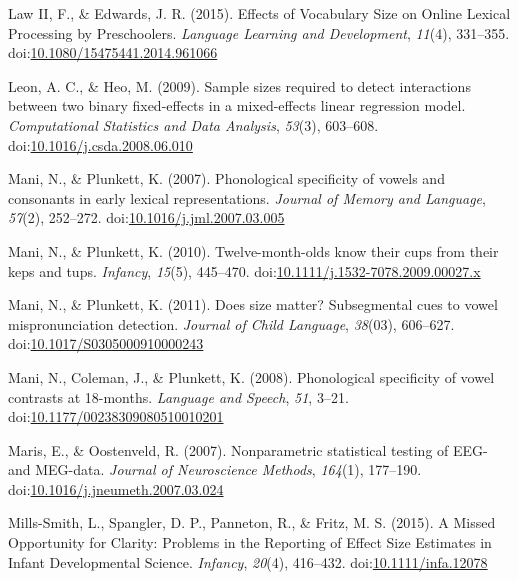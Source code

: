 \documentclass[man]{apa6}
\theoremstyle{definition}
\theoremstyle{definition}
\theoremstyle{definition}
\theoremstyle{remark}
\begin{document}
\hypertarget{ref-Law2015}{}
Law II, F., \& Edwards, J. R. (2015). Effects of Vocabulary Size on
Online Lexical Processing by Preschoolers. \emph{Language Learning and
Development}, \emph{11}(4), 331--355.
doi:\href{https://doi.org/10.1080/15475441.2014.961066}{10.1080/15475441.2014.961066}

\hypertarget{ref-Leon2009}{}
Leon, A. C., \& Heo, M. (2009). Sample sizes required to detect
interactions between two binary fixed-effects in a mixed-effects linear
regression model. \emph{Computational Statistics and Data Analysis},
\emph{53}(3), 603--608.
doi:\href{https://doi.org/10.1016/j.csda.2008.06.010}{10.1016/j.csda.2008.06.010}

\hypertarget{ref-Mani2007}{}
Mani, N., \& Plunkett, K. (2007). Phonological specificity of vowels and
consonants in early lexical representations. \emph{Journal of Memory and
Language}, \emph{57}(2), 252--272.
doi:\href{https://doi.org/10.1016/j.jml.2007.03.005}{10.1016/j.jml.2007.03.005}

\hypertarget{ref-Mani2010kepstups}{}
Mani, N., \& Plunkett, K. (2010). Twelve-month-olds know their cups from
their keps and tups. \emph{Infancy}, \emph{15}(5), 445--470.
doi:\href{https://doi.org/10.1111/j.1532-7078.2009.00027.x}{10.1111/j.1532-7078.2009.00027.x}

\hypertarget{ref-Mani2011}{}
Mani, N., \& Plunkett, K. (2011). Does size matter? Subsegmental cues to
vowel mispronunciation detection. \emph{Journal of Child Language},
\emph{38}(03), 606--627.
doi:\href{https://doi.org/10.1017/S0305000910000243}{10.1017/S0305000910000243}

\hypertarget{ref-Mani2008}{}
Mani, N., Coleman, J., \& Plunkett, K. (2008). Phonological specificity
of vowel contrasts at 18-months. \emph{Language and Speech}, \emph{51},
3--21.
doi:\href{https://doi.org/10.1177/00238309080510010201}{10.1177/00238309080510010201}

\hypertarget{ref-Maris2007}{}
Maris, E., \& Oostenveld, R. (2007). Nonparametric statistical testing
of EEG- and MEG-data. \emph{Journal of Neuroscience Methods},
\emph{164}(1), 177--190.
doi:\href{https://doi.org/10.1016/j.jneumeth.2007.03.024}{10.1016/j.jneumeth.2007.03.024}

\hypertarget{ref-Mills-Smith2015}{}
Mills-Smith, L., Spangler, D. P., Panneton, R., \& Fritz, M. S. (2015).
A Missed Opportunity for Clarity: Problems in the Reporting of Effect
Size Estimates in Infant Developmental Science. \emph{Infancy},
\emph{20}(4), 416--432.
doi:\href{https://doi.org/10.1111/infa.12078}{10.1111/infa.12078}
\end{document}
